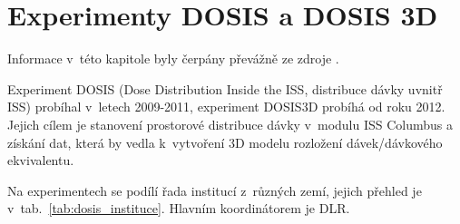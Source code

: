 \chapter{Experimenty DOSIS a DOSIS 3D}
Informace v~této kapitole byly čerpány převážně ze zdroje \cite{dosis}.

Experiment DOSIS (Dose Distribution Inside the ISS, distribuce dávky uvnitř ISS) probíhal v~letech 2009-2011, experiment DOSIS3D probíhá od roku 2012. Jejich cílem je stanovení prostorové distribuce dávky v~modulu ISS Columbus a získání dat, která by vedla k~vytvoření 3D modelu rozložení dávek/dávkového ekvivalentu.

Na experimentech se podílí řada institucí z~různých zemí, jejich přehled je v~tab.~\ref{tab:dosis_instituce}. Hlavním koordinátorem je DLR. 
